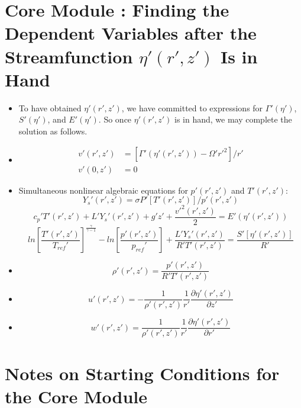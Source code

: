 \documentclass[preprint, prX]{revtex4}
\newcommand{\sbfrac}[2]{\left[\frac{#1}{#2}\right]}
\newcommand{\pd}[2]{\frac{\partial#1}{\partial#2}}
\newcommand{\gogmo}{\frac{\gamma}{\gamma-1}}
\begin{document}
\section{Core Module : Finding the Dependent Variables after the Streamfunction $\eta'(r',z')$ Is in Hand}
\begin{itemize}
\item
To have obtained $\eta'(r',z')$, we have committed to expressions for $\Gamma'(\eta')$, $S'(\eta')$, and $E'(\eta')$. So once $\eta'(r',z')$ is in hand, we may complete the solution as follows.
\item
\begin{equation}
\begin{split}
v'(r',z') &= \left[ \Gamma'(\eta'(r',z')) -\Omega'r'^2 \right]/r' \\
v'(0,z') &= 0
\end{split}
\end{equation}
\item
Simultaneous nonlinear algebraic equations for $p'(r',z')$ and $T'(r',z')$:
\begin{equation}
Y_s'(r',z') = \sigma P'[T'(r',z')] /p'(r',z')
\end{equation}
\begin{equation}
c_p'T'(r',z') + L'Y_s'(r',z') + g'z' + \frac{v'^2(r',z')}{2} = E'(\eta'(r',z'))
\end{equation}
\begin{equation}
ln \sbfrac{T'(r',z')}{T_{ref}'}^\gogmo - ln \sbfrac{p'(r',z')}{p_{ref}'} + \frac{L'Y_s'(r',z')}{R'T'(r',z')} = \frac{S'[\eta'(r',z')]}{R'}
\end{equation}

\item
\begin{equation}
\rho'(r',z') = \frac{p'(r',z')}{R' T'(r',z')}
\end{equation}

\item
\begin{equation}
u'(r',z') = -\frac{1}{\rho'(r',z')}\frac{1}{r'}\pd{\eta'(r',z')}{z'}
\end{equation}

\item
\begin{equation}
w'(r',z') = \frac{1}{\rho'(r',z')}\frac{1}{r'}\pd{\eta'(r',z')}{r'}
\end{equation}

\end{itemize}

\section{Notes on Starting Conditions for the Core Module}
\begin{figure}[h!]
	\centering
	\def\svgwidth{0.7\columnwidth}
	
\end{figure}
\end{document}
